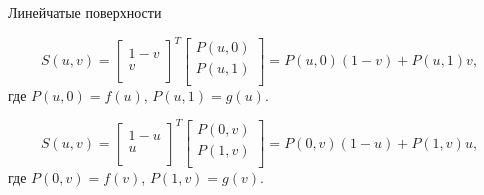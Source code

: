 \documentclass{beamer}
\begin{document}
		\begin{frame}{Линейчатые поверхности}

			\[
				S(u,v) = 
				\begin{bmatrix}
					1-v \\
					v \\
				\end{bmatrix}^T
				\begin{bmatrix}
					P(u,0) \\
					P(u,1) \\
				\end{bmatrix}
				=
				P(u,0)(1-v)+P(u,1)v
				,
				\]
				где $P(u,0)=f(u)$, $P(u,1)=g(u)$.

				\[
					S(u,v) = 
					\begin{bmatrix}
						1-u \\
						u \\
					\end{bmatrix}^T
					\begin{bmatrix}
						P(0,v) \\
						P(1,v) \\
					\end{bmatrix}
					=
					P(0,v)(1-u)+P(1,v)u
					,
				\]
				где $P(0,v)=f(v)$, $P(1,v)=g(v)$.
			\end{frame}
\end{document}
